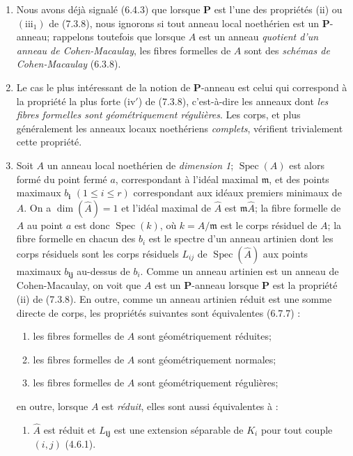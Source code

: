 \begin{remarks}[7.3.19]
\begin{enumerate}
\item[\textup{(ii)}] Nous avons déjà signalé (6.4.3) que lorsque $\boldsymbol P$ est
l'une des propriétés (ii) ou $(\mathrm{iii}_1)$ de (7.3.8), nous ignorons
si tout anneau local noethérien est un $\boldsymbol P$-anneau; rappelons
toutefois que lorsque $A$ est un anneau \emph{quotient d'un anneau de
Cohen-Macaulay}, les fibres formelles de $A$ sont des \emph{schémas de
Cohen-Macaulay} (6.3.8).
\item[\textup{(iii)}] Le cas le plus intéressant de la notion de $\boldsymbol P$-anneau
est celui qui correspond à la propriété la plus forte (iv$'$) de
(7.3.8), c'est-à-dire les anneaux dont \emph{les fibres formelles sont
géométriquement régulières}. Les corps, et plus généralement les anneaux
locaux noethériens \emph{complets}, vérifient trivialement cette
propriété.
\item[\textup{(iv)}] Soit $A$ un anneau local noethérien de \emph{dimension 1};
$\operatorname{Spec}(A)$ est alors formé du point fermé $a$,
correspondant à l'idéal maximal $\mathfrak m$, et des points maximaux
$b_{\boldsymbol{i}}$ $(1\leqslant i\leqslant r)$ correspondant aux idéaux premiers
minimaux de $A$. On a $\dim(\widehat A)=1$ et l'idéal maximal de
$\widehat A$ est $\mathfrak m\widehat A$; la fibre formelle de $A$ au
point $a$ est donc $\operatorname{Spec}(k)$, où $k=A/\mathfrak m$ est le
corps résiduel de $A$; la fibre formelle en chacun des $b_i$ est le
spectre d'un anneau artinien dont les corps résiduels sont les corps
résiduels $L_{ij}$ de $\operatorname{Spec}(\widehat A)$ aux points
maximaux $b_{\boldsymbol{ij}}$ au-dessus de $b_i$. Comme un anneau artinien est un
anneau de Cohen-Macaulay, on voit que $A$ est un
$\boldsymbol P$-anneau lorsque $\boldsymbol P$ est la propriété (ii) de
(7.3.8). En outre, comme un anneau artinien réduit est une somme directe
de corps, les propriétés suivantes sont équivalentes (6.7.7) :
\begin{enumerate}
\item[\emph{a)}] les fibres formelles de $A$ sont géométriquement réduites;
\item[\emph{b)}] les fibres formelles de $A$ sont géométriquement normales;
\item[\emph{c)}] les fibres formelles de $A$ sont géométriquement régulières;
\end{enumerate}
en outre, lorsque $A$ est \emph{réduit}, elles sont aussi équivalentes à :
\begin{enumerate}
\item[\emph{d)}] $\widehat A$ est réduit et $L_{\boldsymbol{ij}}$ est une extension séparable de
$K_i$ pour tout couple $(i,j)$ (4.6.1).
\end{enumerate}


\end{enumerate}
\end{remarks}
